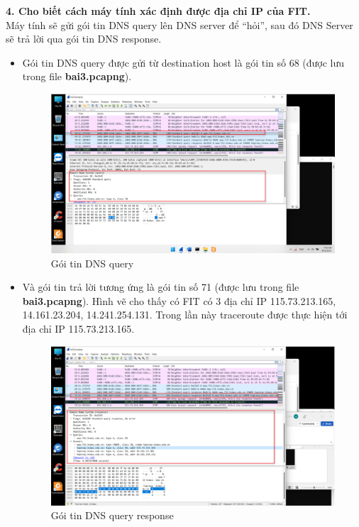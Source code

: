 \textbf{4.	Cho biết cách máy tính xác định được địa chỉ IP của FIT.}\\
Máy tính sẽ gửi gói tin DNS query lên DNS server để “hỏi”, sau đó DNS Server sẽ trả lời qua gói tin DNS response. 
\begin{itemize}
\item Gói tin DNS query được gửi từ destination host là gói tin số 68 (được lưu trong file \textbf{bai3.pcapng}).
\begin{figure}[H]
\begin{center}
\includegraphics[scale=.8]{../figures/p3/p3_dns1}
\end{center}
\caption{Gói tin DNS query}
\end{figure}
\item Và gói tin trả lời tương ứng là gói tin số 71 (được lưu trong file \textbf{bai3.pcapng}). Hình vẽ cho thấy có FIT có 3 địa chỉ IP 115.73.213.165, 14.161.23.204, 14.241.254.131. Trong lần này traceroute được thực hiện tới địa chỉ IP 115.73.213.165. 
\begin{figure}[H]
\begin{center}
\includegraphics[scale=.8]{../figures/p3/p3_dns2}
\end{center}
\caption{Gói tin DNS query response}
\end{figure}
\end{itemize}

